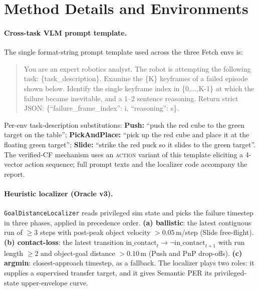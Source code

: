 
\section{Method Details and Environments}
\label{app:methods}

\paragraph{Cross-task VLM prompt template.}
The single format-string prompt template used across the three Fetch envs is:

\begin{quote}
\small\ttfamily
You are an expert robotics analyst. The robot is attempting the
following task: \{task\_description\}. Examine the \{K\} keyframes of a
failed episode shown below. Identify the single keyframe index in
\{0,...,K-1\} at which the failure became inevitable, and a 1--2
sentence reasoning. Return strict JSON: \{``failure\_frame\_index'':
i, ``reasoning'': s\}.
\end{quote}

\noindent
Per-env task-description substitutions:
\textbf{Push:} ``push the red cube to the green target on the table'';
\textbf{PickAndPlace:} ``pick up the red cube and place it at the floating green target'';
\textbf{Slide:} ``strike the red puck so it slides to the green target''.
The verified-CF mechanism uses an \textsc{action} variant of this
template eliciting a 4-vector action sequence; full prompt texts and
the localizer code accompany the report.

\paragraph{Heuristic localizer (Oracle v3).}
\texttt{GoalDistanceLocalizer} reads privileged sim state and picks the
failure timestep in three phases, applied in precedence order.
\textbf{(a) ballistic}: the latest contiguous run of $\ge\!3$ steps
with post-peak object velocity $>\!0.05$\,m/step (Slide free-flight).
\textbf{(b) contact-loss}: the latest transition
$\text{in\_contact}_t\!\to\!\neg\text{in\_contact}_{t+1}$ with run
length $\ge\!2$ and object-goal distance $>\!0.10$\,m (Push and PnP
drop-offs). \textbf{(c) argmin}: closest-approach timestep, as a
fallback. The localizer plays two roles: it supplies a supervised
transfer target, and it gives Semantic PER its privileged-state
upper-envelope curve.

